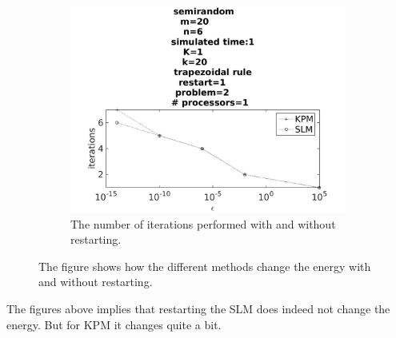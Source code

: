 \begin{figure}[H]
\begin{subfigure}[b]{0.3\textwidth}
                \includegraphics[width=\textwidth]{../MATLAB/fig/compareIter2.jpg}
                \caption{ The number of iterations performed with and without restarting.  }
                \label{fig:compareIter2}
        \end{subfigure}
        \caption{ The figure shows how the different methods change the energy with and without restarting.  }
        \label{fig:compare2}
\end{figure}

The figures above implies that restarting the SLM does indeed not change the energy. But for KPM it changes quite a bit. 

